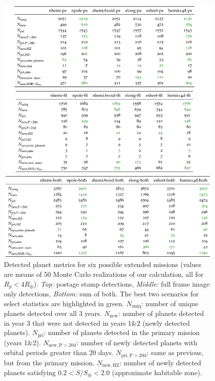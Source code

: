 \begin{figure}[!t]
	\centering
	\includegraphics[scale=2.]{tables/160729_t50_with_earth_moon_Deming_corr.pdf}
	\caption{Detected planet metrics for six possible extended missions (values are means of 50 Monte Carlo realizations of our calculation, all for $R_p<4R_\oplus$).
	\textit{Top:} postage stamp detections, \textit{Middle:} full frame image only detections, \textit{Bottom:} sum of both.
	The best two scenarios for select statistics are highlighted in green.
	\newline
	$N_\mathrm{uniq}$: number of unique planets detected over all 3 years.
	$N_\mathrm{new}$: number of planets detected in year 3 that were not detected in years 1\&2 (newly detected planets).
	$N_\mathrm{pri}$: number of planets detected in the primary mission (years 1\&2).
	$N_\mathrm{new,P>20d}$: number of newly detected planets with orbital periods greater than 20 days.
	$N_\mathrm{pri,P>20d}$: same as previous, but from the primary mission.
	$N_\mathrm{new,HZ}$: number of newly detected planets satisfying $0.2<S/S_\oplus<2.0$ (approximate habitable zone).
}
\end{figure}
